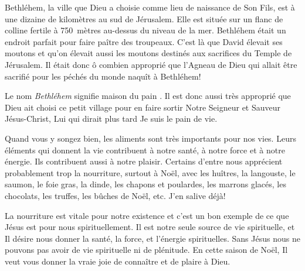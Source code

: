 


Bethléhem, la ville que Dieu a choisie comme lieu de naissance de Son Fils, est à une dizaine de kilomètres au sud de Jérusalem. Elle est située sur un flanc de colline fertile à 750~mètres au-dessus du niveau de la mer. Bethléhem était un endroit parfait pour faire paître des troupeaux. C'est là que David élevait ses moutons et qu'on élevait aussi les moutons destinés aux sacrifices du Temple de Jérusalem. Il était donc ô combien approprié que l'Agneau de Dieu qui allait être sacrifié pour les péchés du monde naquît à Bethléhem!

Le nom \emph{Bethléhem} signifie \Og maison du pain \Fg{}. Il est donc aussi très approprié que Dieu ait choisi ce petit village pour en faire sortir Notre Seigneur et Sauveur Jésus-Christ, Lui qui dirait plus tard\frcolon{} \Og Je suis le pain de vie. \Fg{}

Quand vous y songez bien, les aliments sont très importants pour nos vies. Leurs éléments qui donnent la vie contribuent à notre santé, à notre force et à notre énergie. Ils contribuent aussi à notre plaisir. Certains d'entre nous apprécient probablement trop la nourriture, surtout à Noël, avec les huîtres, la langouste, le saumon, le foie gras, la dinde, les chapons et poulardes, les marrons glacés, les chocolats, les truffes, les bûches de Noël, etc. J'en salive déjà!

La nourriture est vitale pour notre existence et c'est un bon exem\-ple de ce que Jésus est pour nous spirituellement. Il est notre seule source de vie spirituelle, et Il désire nous donner la santé, la force, et l'énergie spirituelles. Sans Jésus nous ne pouvons pas avoir de vie spirituelle ni de plénitude. En cette saison de Noël, Il veut vous donner la vraie joie de connaître et de plaire à Dieu.



\begin{dvquotes}

\end{dvquotes}

